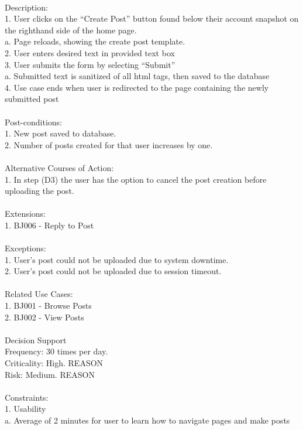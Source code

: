 \documentclass{report}
\begin{document}
\\
Description: \\
1.	User clicks on the “Create Post” button found below their account snapshot on the righthand side of the home page.\\
	a.	Page reloads, showing the create post template. \\
2.	User enters desired text in provided text box\\
3.	User submits the form by selecting “Submit”\\
	a.	Submitted text is sanitized of all html tags, then saved to the database\\
4.	Use case ends when user is redirected to the page containing the newly submitted post\\
\\
Post-conditions: \\
1.	New post saved to database.\\
2.	Number of posts created for that user increases by one.\\
\\
Alternative Courses of Action:\\
1.	In step (D3) the user has the option to cancel the post creation before uploading the post.\\
\\
Extensions:\\
1.	BJ006 - Reply to Post\\
\\
Exceptions: \\
1.	User’s post could not be uploaded due to system downtime.\\
2.	User’s post could not be uploaded due to session timeout.\\
\\
Related Use Cases: \\
1.	BJ001 - Browse Posts\\
2.	BJ002 - View Posts\\
\\
Decision Support\\
     Frequency: 30 times per day.\\
     Criticality: High. REASON\\
     Risk: Medium. REASON\\
\\
Constraints: \\
1.	Usability\\
	a.	Average of 2 minutes for user to learn how to navigate pages and make posts\\
\end{document}
